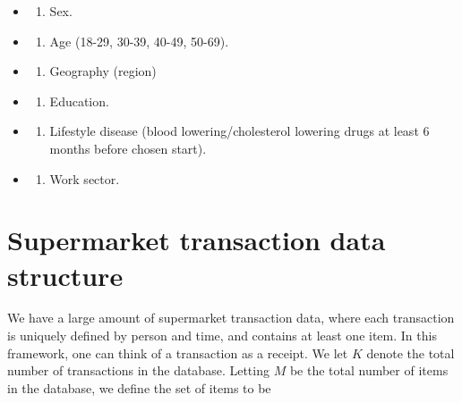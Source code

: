 \documentclass[
  11pt,
]{article}
\providecommand{\tightlist}{%
  \setlength{\itemsep}{0pt}\setlength{\parskip}{0pt}}
\begin{document}
\begin{itemize}
\item
  \begin{enumerate}
  \def\labelenumi{\arabic{enumi})}
  \tightlist
  \item
    Sex.
  \end{enumerate}
\item
  \begin{enumerate}
  \def\labelenumi{\arabic{enumi})}
  \setcounter{enumi}{1}
  \tightlist
  \item
    Age (18-29, 30-39, 40-49, 50-69).
  \end{enumerate}
\item
  \begin{enumerate}
  \def\labelenumi{\arabic{enumi})}
  \setcounter{enumi}{2}
  \tightlist
  \item
    Geography (region)
  \end{enumerate}
\item
  \begin{enumerate}
  \def\labelenumi{\arabic{enumi})}
  \setcounter{enumi}{3}
  \tightlist
  \item
    Education.
  \end{enumerate}
\item
  \begin{enumerate}
  \def\labelenumi{\arabic{enumi})}
  \setcounter{enumi}{4}
  \tightlist
  \item
    Lifestyle disease (blood lowering/cholesterol lowering drugs at
    least 6 months before chosen start).
  \end{enumerate}
\item
  \begin{enumerate}
  \def\labelenumi{\arabic{enumi})}
  \setcounter{enumi}{5}
  \tightlist
  \item
    Work sector.
  \end{enumerate}
\end{itemize}

\hypertarget{supermarket-transaction-data-structure}{%
\section{Supermarket transaction data
structure}\label{supermarket-transaction-data-structure}}

We have a large amount of supermarket transaction data, where each
transaction is uniquely defined by person and time, and contains at
least one item. In this framework, one can think of a transaction as a
receipt. We let \(K\) denote the total number of transactions in the
database. Letting \(M\) be the total number of items in the database, we
define the set of items to be
\end{document}

